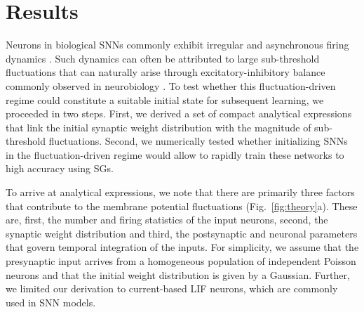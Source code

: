 \documentclass[11pt,a4paper]{article}
\begin{document}
\section*{Results}

Neurons in biological \acp{SNN} commonly exhibit irregular and asynchronous firing dynamics \citep{Tiesinga2000-fc, Kuhn2004-yi, vogels_neural_2005}.
Such dynamics can often be attributed to large sub-threshold fluctuations that can naturally arise through excitatory-inhibitory balance commonly observed in neurobiology \citep{brunel_dynamics_2000, vogels_neural_2005}.
To test  whether this fluctuation-driven regime could constitute a suitable initial state for subsequent learning, we proceeded in two steps. 
First, we derived a set of compact analytical expressions that link the initial synaptic weight distribution with the magnitude of sub-threshold fluctuations.
Second, we numerically tested whether initializing \acp{SNN} in the fluctuation-driven regime would allow to rapidly train these networks to high accuracy using \acp{SG}.

To arrive at analytical expressions, we note that there are primarily three factors that contribute to the membrane potential fluctuations (Fig.~\ref{fig:theory}a).
These are, first, the number and firing statistics of the input neurons, second, the synaptic weight distribution and third, the postsynaptic and neuronal parameters that govern temporal integration of the inputs. 
For simplicity, we assume that the presynaptic input arrives from a homogeneous population of independent Poisson neurons and that the initial weight distribution is given by a Gaussian.
Further, we limited our derivation to current-based \ac{LIF} neurons, which are commonly used in \ac{SNN} models.
\end{document}
